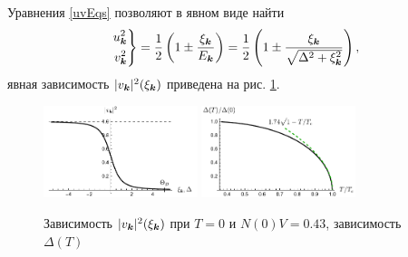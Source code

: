 Уравнения \eqref{uvEqs} позволяют в явном виде найти
\begin{equation*}
	\left.\begin{aligned}
	    u_{{\boldsymbol{k}}}^2 \\
	    v_{{\boldsymbol{k}}}^2
	\end{aligned}\right\}
	= \frac{1}{2} \left(1 \pm \frac{\xi_{{\boldsymbol{k}}}}{E_{{\boldsymbol{k}}}}\right) = \frac{1}{2}\left(
		1 \pm \frac{\xi_{{\boldsymbol{k}}}}{\sqrt{\Delta^2 + \xi_{{\boldsymbol{k}}}^2}}
	\right),
\end{equation*}
явная зависимость $|v_{{\boldsymbol{k}}}|^2(\xi_{{\boldsymbol{k}}})$ приведена на рис. \ref{fig:1}.	



\begin{figure}[h]
    \centering
    \includegraphics[width=0.4\textwidth]{plot_1.pdf}
    \hspace{10 mm} 
    \includegraphics[width=0.4\textwidth]{plot_2.pdf}
    \caption{Зависимость $|v_{{\boldsymbol{k}}}|^2(\xi_{{\boldsymbol{k}}})$ при $T=0$ и $N(0) V = 0.43$, зависимость $\Delta(T)$}
    \label{fig:1}
\end{figure}


